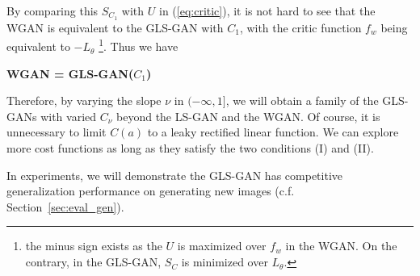 By comparing this $S_{C_1}$ with $U$ in (\ref{eq:critic}), it is not hard to see that the WGAN is equivalent to the GLS-GAN with $C_1$, with the critic function $f_w$ being equivalent to $-L_\theta$ \footnote{the minus sign exists as the $U$ is maximized over $f_w$ in the WGAN. On the contrary, in the GLS-GAN, $S_C$ is minimized over $L_\theta$.}. Thus we have

\vspace{1mm}\centerline{\bf WGAN = GLS-GAN($C_1$)}\vspace{1mm}

Therefore, by varying the slope $\nu$ in $(-\infty,1]$, we will obtain a family of the GLS-GANs with varied $C_\nu$ beyond the LS-GAN and the WGAN.
Of course, it is unnecessary to limit $C(a)$ to a leaky rectified linear function. We can explore more cost functions as long as they satisfy the two conditions (I) and (II).

In experiments, we will demonstrate the GLS-GAN has competitive generalization performance on generating new images (c.f. Section~\ref{sec:eval_gen}).




